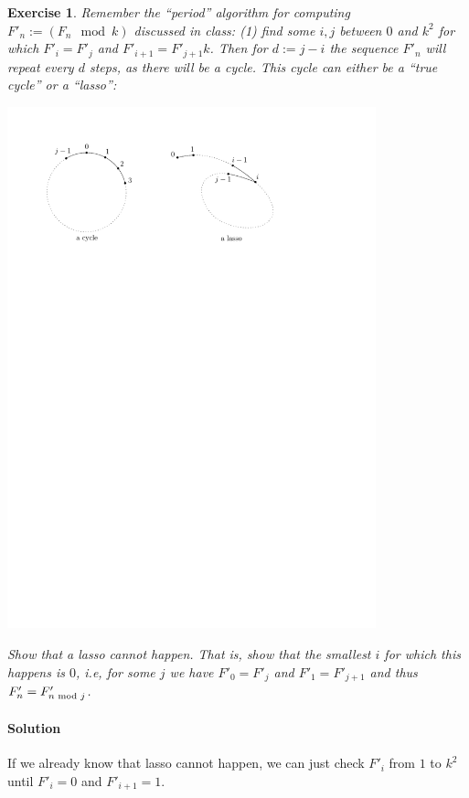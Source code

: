 \documentclass[12pt,a4]{article}
\newtheorem{exercise}[theorem]{Exercise}
\begin{document}
\begin{exercise}
  Remember the ``period'' algorithm for computing $F'_n := (F_n \mod k)$ discussed in class:
  (1) find some $i,j$ between $0$ and $k^2$ for which 
  $F'_{i} =  F'_{j}$ and $F'_{i+1} = F'_{j+1} k$. 
  Then for $d := j-i$ the sequence $F'_{n}$ will repeat every $d$ steps, as there will be a cycle.
  This cycle can either be a ``true cycle'' or a ``lasso'':
  \begin{center}
  \includegraphics[width=0.8\textwidth]{figures/cycle-and-lasso.pdf}
  \end{center}
  
  Show that a lasso cannot happen. That is, show 
  that the smallest $i$ for which this happens is $0$, i.e, for some $j$ we have
  $F'_0 = F'_j$ and $F'_1 = F'_{j+1}$ and thus $F'_n = F'_{n \textnormal{ mod }  j}$.
\end{exercise}
 \paragraph{Solution}
  If we already know that lasso cannot happen, we can just check $F'_i$ from $1$ to
  $k^2$ until $F'_i = 0$ and $F'_{i+1} = 1$.
\end{document}
